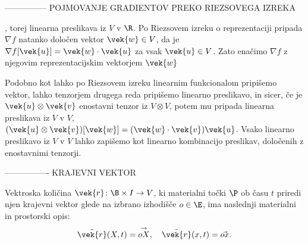 ---------------
POJMOVANJE GRADIENTOV PREKO RIEZSOVEGA IZREKA

, torej linearna preslikava iz $V$ v $\R$. Po Riezsovem izreku o reprezentaciji
pripada $\nabla f$ natanko določen vektor $\vek{w}\in V$, da je $\nabla f[\vek{u}]=\vek{w}\cdot\vek{u}$ za vsak
$\vek{u}\in V$. Zato enačimo $\nabla f$ z njegovim reprezentacijskim vektorjem $\vek{w}$

Podobno kot lahko po Riezsovem izreku linearnim funkcionalom pripišemo vektor, lahko
tenzorjem drugega reda pripišemo linearno preslikavo, in sicer, če je $\vek{u}\otimes\vek{v}$
enostavni tenzor iz $V\otimes V$, potem mu pripada linearna preslikava iz $V$ v $V$,
$(\vek{u}\otimes\vek{v})[\vek{w}]=(\vek{w}\cdot\vek{v})\vek{u}$. Vsako linearno preslikavo
iz $V$ v $V$ lahko zapišemo kot linearno kombinacijo preslikav, določenih z enostavnimi tenzorji.

----------------
KRAJEVNI VEKTOR

\begin{primer}
	Vektroska količina $\vek{r} \colon \B\times I \rightarrow V$, ki materialni točki $\P$ ob času $t$ priredi
	njen krajevni vektor glede na izbrano izhodišče $o\in\E$, ima naslednji materialni in prostorski opis:
	\begin{equation*}
		\hat{\vek{r}}(X,t) = \overset{\rightarrow}{oX},\quad \bar{\vek{r}}(x,t)=\vec{ox}.
	\end{equation*}
\end{primer}